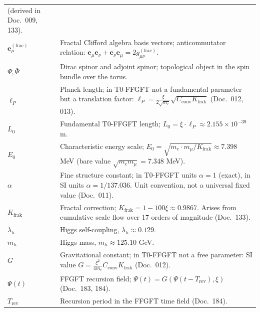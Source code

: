 \begin{longtable}{lp{9.5cm}}
        (derived in Doc.~009, 133). \\[4pt]
$\mathbf{e}_\mu^{(\mathrm{frac})}$ & Fractal Clifford algebra basis vectors;
        anticommutator relation:
        $\mathbf{e}_\mu\mathbf{e}_\nu + \mathbf{e}_\nu\mathbf{e}_\mu
        = 2g_{\mu\nu}^{(\mathrm{frac})}$. \\[4pt]
$\Psi, \bar{\Psi}$ & Dirac spinor and adjoint spinor;
        topological object in the spin bundle over the torus. \\[4pt]
$\ell_P$ & Planck length; in T0-FFGFT not a fundamental parameter
        but a translation factor:
        $\ell_P = \frac{\xi}{2\sqrt{m_e}}\sqrt{C_{\text{conv}}K_{\text{frak}}}$ (Doc.~012, 013). \\[4pt]
$L_0$ & Fundamental T0-FFGFT length;
        $L_0 = \xi \cdot \ell_P \approx 2.155 \times 10^{-39}$ m. \\[4pt]
$E_0$ & Characteristic energy scale;
        $E_0 = \sqrt{m_e \cdot m_\mu/K_{\text{frak}}} \approx 7.398$ MeV
        (bare value $\sqrt{m_e m_\mu} = 7.348$ MeV). \\[4pt]
$\alpha$ & Fine structure constant; in T0-FFGFT units $\alpha = 1$
        (exact), in SI units $\alpha = 1/137.036$.
        Unit convention, not a universal fixed value (Doc.~011). \\[4pt]
$K_{\text{frak}}$ & Fractal correction;
        $K_{\text{frak}} = 1 - 100\xi \approx 0.9867$.
        Arises from cumulative scale flow over 17 orders of magnitude
        (Doc.~133). \\[4pt]
$\lambda_h$ & Higgs self-coupling, $\lambda_h \approx 0.129$. \\[4pt]
$m_h$ & Higgs mass, $m_h \approx 125.10$ GeV. \\[4pt]
$G$ & Gravitational constant; in T0-FFGFT not a free parameter:
        SI value $G = \frac{\xi^2}{4m_e}C_{\text{conv}}K_{\text{frak}}$ (Doc.~012). \\[4pt]
$\Psi(t)$ & FFGFT recursion field;
        $\Psi(t) = G(\Psi(t-T_{\mathrm{rev}}), \xi)$ (Doc.~183, 184). \\[4pt]
$T_{\mathrm{rev}}$ & Recursion period in the FFGFT time field (Doc.~184). \\
\bottomrule
\end{longtable}

